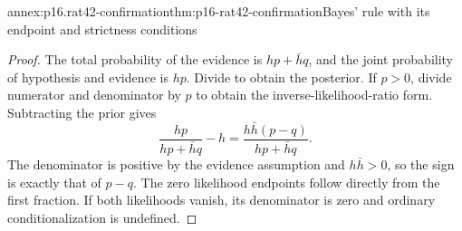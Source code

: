 \begin{annexitem}{annex:p16.rat42-confirmation}{thm:p16-rat42-confirmation}{Bayes' rule with its endpoint and strictness conditions}
\begin{proof}
The total probability of the evidence is \(hp+\bar hq\), and
the joint probability of hypothesis and evidence is \(hp\).
Divide to obtain the posterior. If \(p>0\), divide numerator
and denominator by \(p\) to obtain the inverse-likelihood-ratio
form. Subtracting the prior gives
\[
 \frac{hp}{hp+\bar hq}-h
       =\frac{h\bar h(p-q)}{hp+\bar hq}.
\]
The denominator is positive by the evidence assumption and
\(h\bar h>0\), so the sign is exactly that of \(p-q\).
The zero likelihood endpoints follow directly from the first
fraction. If both likelihoods vanish, its denominator is zero
and ordinary conditionalization is undefined.
\end{proof}
\end{annexitem}

